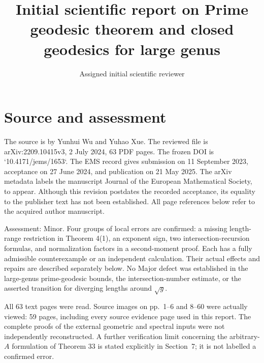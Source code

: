 \documentclass[10pt]{article}
\title{Initial scientific report on
Prime geodesic theorem and closed geodesics for large genus}
\author{Assigned initial scientific reviewer}
\date{}
\begin{document}
\maketitle
\section*{Source and assessment}
The source is by Yunhui Wu and Yuhao Xue. The reviewed file is arXiv:2209.10415v3, 2 July 2024, 63 PDF pages. The frozen DOI is `10.4171/jems/1653`. The EMS record gives submission on 11 September 2023, acceptance on 27 June 2024, and publication on 21 May 2025. The arXiv metadata labels the manuscript Journal of the European Mathematical Society, to appear. Although this revision postdates the recorded acceptance, its equality to the publisher text has not been established. All page references below refer to the acquired author manuscript.\par
Assessment: Minor. Four groups of local errors are confirmed: a missing length-range restriction in Theorem 4(1), an exponent sign, two intersection-recursion formulas, and normalization factors in a second-moment proof. Each has a fully admissible counterexample or an independent calculation. Their actual effects and repairs are described separately below. No Major defect was established in the large-genus prime-geodesic bounds, the intersection-number estimate, or the asserted transition for diverging lengths around \(\sqrt g\).\par
All 63 text pages were read. Source images on pp. 1–6 and 8–60 were actually viewed: 59 pages, including every source evidence page used in this report. The complete proofs of the external geometric and spectral inputs were not independently reconstructed. A further verification limit concerning the arbitrary-\(A\) formulation of Theorem 33 is stated explicitly in Section 7; it is not labelled a confirmed error.\par
\end{document}
